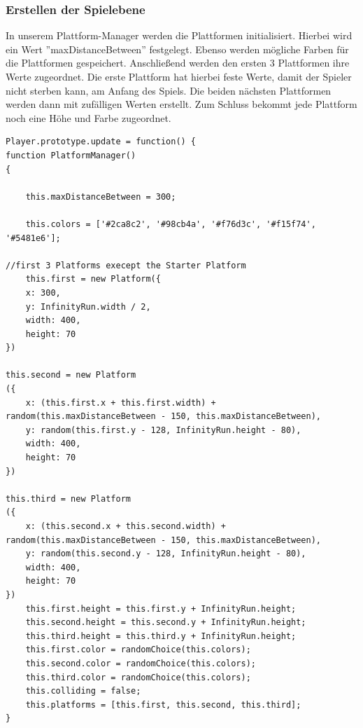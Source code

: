 \subsubsection{Erstellen der Spielebene}
In unserem Plattform-Manager werden die Plattformen initialisiert. Hierbei wird ein Wert ''maxDistanceBetween'' festgelegt. Ebenso werden mögliche Farben für die Plattformen gespeichert. Anschließend werden den ersten 3 Plattformen ihre Werte zugeordnet. Die erste Plattform hat hierbei feste Werte, damit der Spieler nicht sterben kann, am Anfang des Spiels. Die beiden nächsten Plattformen werden dann mit zufälligen Werten erstellt. Zum Schluss bekommt jede Plattform noch eine Höhe und Farbe zugeordnet.
\lstset{language=java}
\begin{lstlisting}[frame=single]
Player.prototype.update = function() {
function PlatformManager() 
{

	this.maxDistanceBetween = 300;

	this.colors = ['#2ca8c2', '#98cb4a', '#f76d3c', '#f15f74', '#5481e6'];

//first 3 Platforms execept the Starter Platform
	this.first = new Platform({
	x: 300,
	y: InfinityRun.width / 2,
	width: 400,
	height: 70
})

this.second = new Platform
({
	x: (this.first.x + this.first.width) + random(this.maxDistanceBetween - 150, this.maxDistanceBetween),
	y: random(this.first.y - 128, InfinityRun.height - 80),
	width: 400,
	height: 70
})

this.third = new Platform
({
	x: (this.second.x + this.second.width) + random(this.maxDistanceBetween - 150, this.maxDistanceBetween),
	y: random(this.second.y - 128, InfinityRun.height - 80),
	width: 400,
	height: 70
})
	this.first.height = this.first.y + InfinityRun.height;
	this.second.height = this.second.y + InfinityRun.height;
	this.third.height = this.third.y + InfinityRun.height;
	this.first.color = randomChoice(this.colors);
	this.second.color = randomChoice(this.colors);
	this.third.color = randomChoice(this.colors);
	this.colliding = false;
	this.platforms = [this.first, this.second, this.third];
}
\end{lstlisting}
